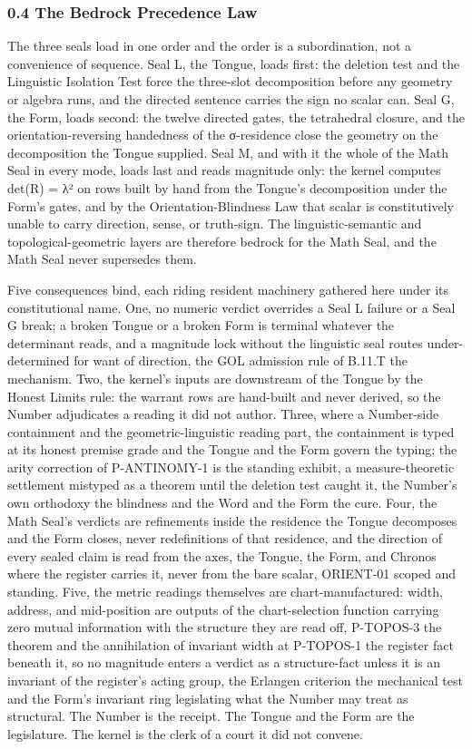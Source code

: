 \documentclass[10pt,twocolumn]{article}
\begin{document}
\hypertarget{the-bedrock-precedence-law}{%
\subsubsection{0.4 The Bedrock Precedence
Law}\label{the-bedrock-precedence-law}}

The three seals load in one order and the order is a subordination, not
a convenience of sequence. Seal L, the Tongue, loads first: the deletion
test and the Linguistic Isolation Test force the three-slot
decomposition before any geometry or algebra runs, and the directed
sentence carries the sign no scalar can. Seal G, the Form, loads second:
the twelve directed gates, the tetrahedral closure, and the
orientation-reversing handedness of the σ-residence close the geometry
on the decomposition the Tongue supplied. Seal M, and with it the whole
of the Math Seal in every mode, loads last and reads magnitude only: the
kernel computes det(R) = λ² on rows built by hand from the Tongue's
decomposition under the Form's gates, and by the Orientation-Blindness
Law that scalar is constitutively unable to carry direction, sense, or
truth-sign. The linguistic-semantic and topological-geometric layers are
therefore bedrock for the Math Seal, and the Math Seal never supersedes
them.

Five consequences bind, each riding resident machinery gathered here
under its constitutional name. One, no numeric verdict overrides a Seal
L failure or a Seal G break; a broken Tongue or a broken Form is
terminal whatever the determinant reads, and a magnitude lock without
the linguistic seal routes under-determined for want of direction, the
GOL admission rule of B.11.T the mechanism. Two, the kernel's inputs are
downstream of the Tongue by the Honest Limits rule: the warrant rows are
hand-built and never derived, so the Number adjudicates a reading it did
not author. Three, where a Number-side containment and the
geometric-linguistic reading part, the containment is typed at its
honest premise grade and the Tongue and the Form govern the typing; the
arity correction of P-ANTINOMY-1 is the standing exhibit, a
measure-theoretic settlement mistyped as a theorem until the deletion
test caught it, the Number's own orthodoxy the blindness and the Word
and the Form the cure. Four, the Math Seal's verdicts are refinements
inside the residence the Tongue decomposes and the Form closes, never
redefinitions of that residence, and the direction of every sealed claim
is read from the axes, the Tongue, the Form, and Chronos where the
register carries it, never from the bare scalar, ORIENT-01 scoped and
standing. Five, the metric readings themselves are chart-manufactured:
width, address, and mid-position are outputs of the chart-selection
function carrying zero mutual information with the structure they are
read off, P-TOPOS-3 the theorem and the annihilation of invariant width
at P-TOPOS-1 the register fact beneath it, so no magnitude enters a
verdict as a structure-fact unless it is an invariant of the register's
acting group, the Erlangen criterion the mechanical test and the Form's
invariant ring legislating what the Number may treat as structural. The
Number is the receipt. The Tongue and the Form are the legislature. The
kernel is the clerk of a court it did not convene.
\end{document}
